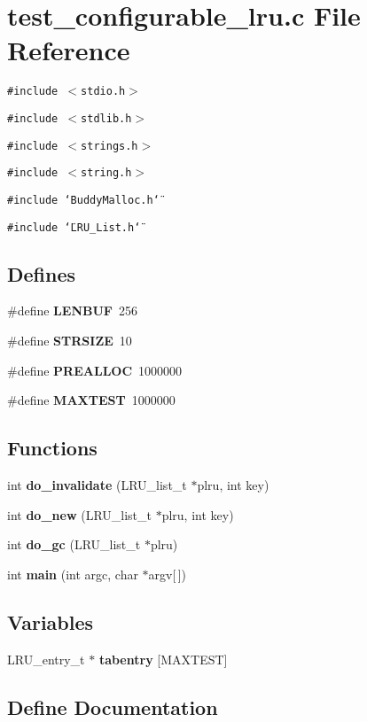 \section{test\_\-configurable\_\-lru.c File Reference}
\label{test__configurable__lru_8c}
{\tt \#include $<$stdio.h$>$}\par
{\tt \#include $<$stdlib.h$>$}\par
{\tt \#include $<$strings.h$>$}\par
{\tt \#include $<$string.h$>$}\par
{\tt \#include \char`\"{}Buddy\-Malloc.h\char`\"{}}\par
{\tt \#include \char`\"{}LRU\_\-List.h\char`\"{}}\par
\subsection*{Defines}
\begin{CompactItemize}
\item 
\#define {\bf LENBUF}\ 256
\item 
\#define {\bf STRSIZE}\ 10
\item 
\#define {\bf PREALLOC}\ 1000000
\item 
\#define {\bf MAXTEST}\ 1000000
\end{CompactItemize}
\subsection*{Functions}
\begin{CompactItemize}
\item 
int {\bf do\_\-invalidate} (LRU\_\-list\_\-t $\ast$plru, int key)
\item 
int {\bf do\_\-new} (LRU\_\-list\_\-t $\ast$plru, int key)
\item 
int {\bf do\_\-gc} (LRU\_\-list\_\-t $\ast$plru)
\item 
int {\bf main} (int argc, char $\ast$argv[$\,$])
\end{CompactItemize}
\subsection*{Variables}
\begin{CompactItemize}
\item 
LRU\_\-entry\_\-t $\ast$ {\bf tabentry} [MAXTEST]
\end{CompactItemize}


\subsection{Define Documentation}
